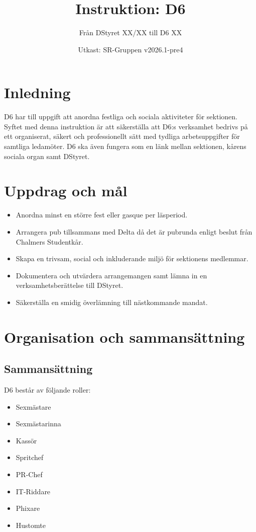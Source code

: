 \documentclass[a4paper]{dtekinstruktion}
\title{Instruktion: D6}
\subtitle{Från DStyret XX/XX till D6 XX}
\date{Utkast: SR-Gruppen v2026.1-pre4}
\begin{document}
\makeheadfoot

\tableofcontents

\section{Inledning}
D6 har till uppgift att anordna festliga och sociala aktiviteter för sektionen. Syftet med denna instruktion är att säkerställa att D6:s verksamhet bedrivs på ett organiserat, säkert och professionellt sätt med tydliga arbetsuppgifter för samtliga ledamöter. D6 ska även fungera som en länk mellan sektionen, kårens sociala organ samt DStyret.

\section{Uppdrag och mål}
\begin{itemize}
  \item Anordna minst en större fest eller gasque per läsperiod.
  \item Arrangera pub tillsammans med Delta då det är pubrunda enligt beslut från Chalmers Studentkår.
  \item Skapa en trivsam, social och inkluderande miljö för sektionens medlemmar.
  \item Dokumentera och utvärdera arrangemangen samt lämna in en verksamhetsberättelse till DStyret.
  \item Säkerställa en smidig överlämning till nästkommande mandat.
\end{itemize}

\section{Organisation och sammansättning}
\subsection{Sammansättning}
D6 består av följande roller:
\begin{itemize}
  \item Sexmästare
  \item Sexmästarinna
  \item Kassör
  \item Spritchef
  \item PR-Chef
  \item IT-Riddare
  \item Phixare
  \item Hustomte
\end{itemize}
\end{document}
